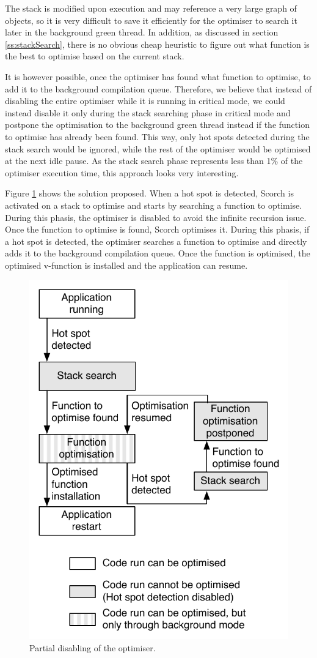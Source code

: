\documentclass[a4paper,12pt,twoside]{../includes/ThesisStyle}
\begin{document}
The stack is modified upon execution and may reference a very large graph of objects, so it is very difficult to save it efficiently for the optimiser to search it later in the background green thread. In addition, as discussed in section \ref{ss:stackSearch}, there is no obvious cheap heuristic to figure out what function is the best to optimise based on the current stack. 

It is however possible, once the optimiser has found what function to optimise, to add it to the background compilation queue. Therefore, we believe that instead of disabling the entire optimiser while it is running in critical mode, we could instead disable it only during the stack searching phase in critical mode and postpone the optimisation to the background green thread instead if the function to optimise has already been found. This way, only hot spots detected during the stack search would be ignored, while the rest of the optimiser would be optimised at the next idle pause. As the stack search phase represents less than 1\% of the optimiser execution time, this approach looks very interesting.

Figure \ref{fig:PartialDisabling} shows the solution proposed. When a hot spot is detected, Scorch is activated on a stack to optimise and starts by searching a function to optimise. During this phasis, the optimiser is disabled to avoid the infinite recursion issue. Once the function to optimise is found, Scorch optimises it. During this phasis, if a hot spot is detected, the optimiser searches a function to optimise and directly adds it to the background compilation queue. Once the function is optimised, the optimised v-function is installed and the application can resume.

\begin{figure}[h!]
    \begin{center}
        \includegraphics[width=0.55\linewidth]{PartialDisabling}
        \caption{Partial disabling of the optimiser.}
        \label{fig:PartialDisabling}
    \end{center}
\end{figure}
\end{document}
